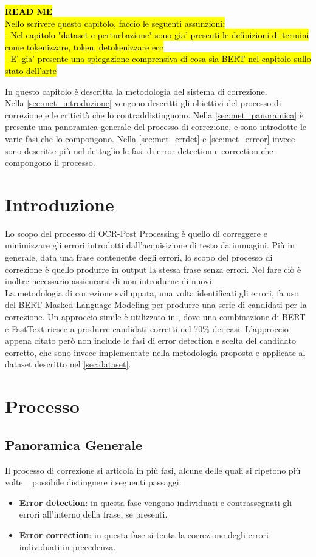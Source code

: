 \hl{\textbf{READ ME}}\\
\hl{Nello scrivere questo capitolo, faccio le seguenti assunzioni:\\
- Nel capitolo "dataset e perturbazione" sono gia' presenti le definizioni di termini come tokenizzare, token, detokenizzare ecc\\
- E' gia' presente una spiegazione comprensiva di cosa sia BERT nel capitolo sullo stato dell'arte}


In questo capitolo è descritta la metodologia del sistema di correzione.\\
Nella \autoref{sec:met_introduzione} vengono descritti gli obiettivi del processo di correzione e le criticità che lo contraddistinguono.
Nella \autoref{sec:met_panoramica} è presente una panoramica generale del processo di correzione, e sono introdotte le varie fasi che lo compongono. Nella \autoref{sec:met_errdet} e \autoref{sec:met_errcor} invece sono descritte più nel dettaglio le fasi di error detection e correction che compongono il processo.


\section{Introduzione}
\label{sec:met_introduzione}
Lo scopo del processo di OCR-Post Processing è quello di correggere e minimizzare gli errori introdotti dall'acquisizione di testo da immagini. Più in generale, data una frase contenente degli errori, lo scopo del processo di correzione è quello produrre in output la stessa frase senza errori. Nel fare ciò è inoltre necessario assicurarsi di non introdurne di nuovi.\\
La metodologia di correzione sviluppata, una volta identificati gli errori, fa uso del BERT Masked Language Modeling per produrre una serie di candidati per la correzione. Un approccio simile è utilizzato in \cite{OCRMaskFilling}, dove una combinazione di BERT e FastText riesce a produrre candidati corretti nel 70\% dei casi. L'approccio appena citato però non include le fasi di error detection e scelta del candidato corretto, che sono invece implementate nella metodologia proposta e applicate al dataset descritto nel \autoref{sec:dataset}.

\section{Processo}
\label{sec:met_processo}

\subsection{Panoramica Generale}
\label{sec:met_panoramica}
Il processo di correzione si articola in più fasi, alcune delle quali si ripetono più volte. \E\ possibile distinguere i seguenti passaggi:
\begin{itemize}
\item \textbf{Error detection}: in questa fase vengono individuati e contrassegnati gli errori all'interno della frase, se presenti.
\item \textbf{Error correction}: in questa fase si tenta la correzione degli errori individuati in precedenza.
\end{itemize}

